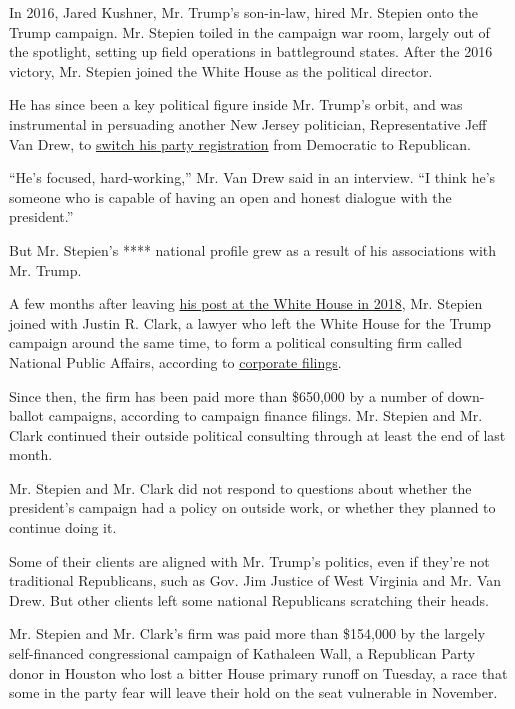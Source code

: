 In 2016, Jared Kushner, Mr. Trump's son-in-law, hired Mr. Stepien onto
the Trump campaign. Mr. Stepien toiled in the campaign war room, largely
out of the spotlight, setting up field operations in battleground
states. After the 2016 victory, Mr. Stepien joined the White House as
the political director.

He has since been a key political figure inside Mr. Trump's orbit, and
was instrumental in persuading another New Jersey politician,
Representative Jeff Van Drew, to
\href{https://www.nytimes3xbfgragh.onion/2019/12/19/us/politics/jeff-van-drew-trump.html}{switch
his party registration} from Democratic to Republican.

``He's focused, hard-working,'' Mr. Van Drew said in an interview. ``I
think he's someone who is capable of having an open and honest dialogue
with the president.''

But Mr. Stepien's **** national profile grew as a result of his
associations with Mr. Trump.

A few months after leaving
\href{https://thehill.com/homenews/campaign/420207-two-top-trump-aides-leave-white-house-to-join-trumps-reelection-campaign}{his
post at the White House in 2018}, Mr. Stepien joined with Justin R.
Clark, a lawyer who left the White House for the Trump campaign around
the same time, to form a political consulting firm called National
Public Affairs, according to
\href{https://www.documentcloud.org/documents/6990079-Trump-Campaign-Officials-Are-Moonlighting.html}{corporate
filings}.

Since then, the firm has been paid more than \$650,000 by a number of
down-ballot campaigns, according to campaign finance filings. Mr.
Stepien and Mr. Clark continued their outside political consulting
through at least the end of last month.

Mr. Stepien and Mr. Clark did not respond to questions about whether the
president's campaign had a policy on outside work, or whether they
planned to continue doing it.

Some of their clients are aligned with Mr. Trump's politics, even if
they're not traditional Republicans, such as Gov. Jim Justice of West
Virginia and Mr. Van Drew. But other clients left some national
Republicans scratching their heads.

Mr. Stepien and Mr. Clark's firm was paid more than \$154,000 by the
largely self-financed congressional campaign of Kathaleen Wall, a
Republican Party donor in Houston who lost a bitter House primary runoff
on Tuesday, a race that some in the party fear will leave their hold on
the seat vulnerable in November.

